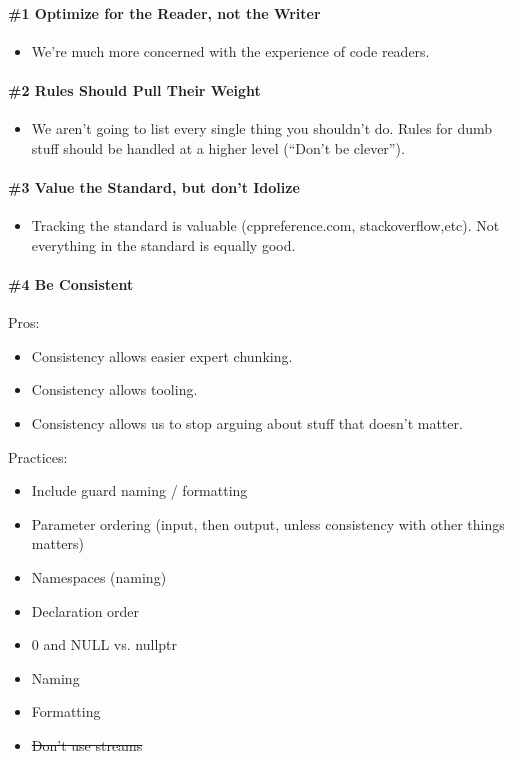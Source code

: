 \paragraph*{\#1 Optimize for the Reader, not the Writer}
\begin{itemize}
    \item We’re much more concerned with the experience of code readers.
\end{itemize}

\paragraph*{\#2 Rules Should Pull Their Weight}
\begin{itemize}
    \item We aren’t going to list every single thing you shouldn’t do. Rules for dumb stuff should be handled at a higher level (\enquote{Don’t be clever}).
\end{itemize}

\paragraph*{\#3 Value the Standard, but don’t Idolize}
\begin{itemize}
    \item Tracking the standard is valuable (cppreference.com, stackoverflow,etc). Not everything in the standard is equally good.
\end{itemize}

\paragraph*{\#4 Be Consistent}\mbox{}\newline
Pros:
\begin{itemize}
    \item Consistency allows easier expert chunking.
    \item Consistency allows tooling.
    \item Consistency allows us to stop arguing about stuff that doesn’t matter.
\end{itemize}
Practices:
\begin{itemize}
    \item Include guard naming / formatting
    \item Parameter ordering (input, then output, unless consistency with other things matters)
    \item Namespaces (naming)
    \item Declaration order
    \item 0 and NULL vs. nullptr
    \item Naming
    \item Formatting
    \item \color{red}\sout{Don’t use streams}
\end{itemize}

